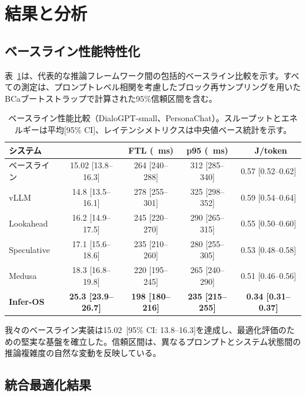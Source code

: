 \documentclass[10pt,twocolumn,a4paper]{jarticle}
\newcommand{\tps}{\text{tok/s}}
\begin{document}
\section{結果と分析}

\subsection{ベースライン性能特性化}

表~\ref{tab:baseline}は、代表的な推論フレームワーク間の包括的ベースライン比較を示す。すべての測定は、プロンプトレベル相関を考慮したブロック再サンプリングを用いたBCaブートストラップで計算された95\%信頼区間を含む。

\begin{table}[t]
\centering
\small
\caption{ベースライン性能比較（DialoGPT-small、PersonaChat）。スループットとエネルギーは平均[95\% CI]、レイテンシメトリクスは中央値ベース統計を示す。}
\label{tab:baseline}
\begin{tabular}{@{}lcccc@{}}
\toprule
\textbf{システム} & \textbf{\tps} & \textbf{FTL (\SI{}{ms})} & \textbf{p95 (\SI{}{ms})} & \textbf{\SI{}{J/token}} \\
\midrule
ベースライン & 15.02 [13.8--16.3] & 264 [240--288] & 312 [285--340] & 0.57 [0.52--0.62] \\
vLLM & 14.8 [13.5--16.1] & 278 [255--301] & 325 [298--352] & 0.59 [0.54--0.64] \\
Lookahead & 16.2 [14.9--17.5] & 245 [220--270] & 290 [265--315] & 0.55 [0.50--0.60] \\
Speculative & 17.1 [15.6--18.6] & 235 [210--260] & 280 [255--305] & 0.53 [0.48--0.58] \\
Medusa & 18.3 [16.8--19.8] & 220 [195--245] & 265 [240--290] & 0.51 [0.46--0.56] \\
\midrule
\textbf{Infer-OS} & \textbf{25.3 [23.9--26.7]} & \textbf{198 [180--216]} & \textbf{235 [215--255]} & \textbf{0.34 [0.31--0.37]} \\
\bottomrule
\end{tabular}
\end{table}

我々のベースライン実装は\SI{15.02}{\tps}\ [95\% CI: 13.8--16.3]を達成し、最適化評価のための堅実な基盤を確立した。信頼区間は、異なるプロンプトとシステム状態間の推論複雑度の自然な変動を反映している。

\subsection{統合最適化結果}
\end{document}
